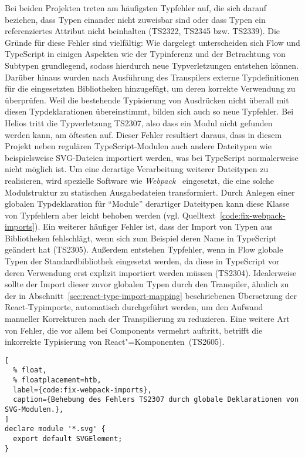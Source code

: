 Bei beiden Projekten treten am häufigsten Typfehler auf, die sich darauf beziehen, dass Typen einander nicht zuweisbar sind oder dass Typen ein referenziertes Attribut nicht beinhalten (TS2322, TS2345 bzw. TS2339). Die Gründe für diese Fehler sind vielfältig: Wie dargelegt unterscheiden sich Flow und TypeScript in einigen Aspekten wie der Typinferenz und der Betrachtung von Subtypen grundlegend, sodass hierdurch neue Typverletzungen entstehen können. Darüber hinaus wurden nach Ausführung des Transpilers externe Typdefinitionen für die eingesetzten Bibliotheken hinzugefügt, um deren korrekte Verwendung zu überprüfen. Weil die bestehende Typisierung von Ausdrücken nicht überall mit diesen Typdeklarationen übereinstimmt, bilden sich auch so neue Typfehler. Bei Helios tritt die Typverletzung TS2307, also dass ein Modul nicht gefunden werden kann, am öftesten auf. Dieser Fehler resultiert daraus, dass in diesem Projekt neben regulären TypeScript-Modulen auch andere Dateitypen wie beispielsweise SVG-Dateien importiert werden, was bei TypeScript normalerweise nicht möglich ist. Um eine derartige Verarbeitung weiterer Dateitypen zu realisieren, wird spezielle Software wie \textit{Webpack}~\autocite{WEBPACK} eingesetzt, die eine solche Modulstruktur zu statischen Ausgabedateien transformiert. Durch Anlegen einer globalen Typdeklaration für \enquote{Module} derartiger Dateitypen kann diese Klasse von Typfehlern aber leicht behoben werden (vgl. Quelltext~\ref{code:fix-webpack-imports}). Ein weiterer häufiger Fehler ist, dass der Import von Typen aus Bibliotheken fehlschlägt, wenn sich zum Beispiel deren Name in TypeScript geändert hat (TS2305). Außerdem entstehen Typfehler, wenn in Flow globale Typen der Standardbibliothek eingesetzt werden, da diese in TypeScript vor deren Verwendung erst explizit importiert werden müssen (TS2304). Idealerweise sollte der Import dieser zuvor globalen Typen durch den Transpiler, ähnlich zu der in Abschnitt~\ref{sec:react-type-import-mapping} beschriebenen Übersetzung der React-Typimporte, automatisch durchgeführt werden, um den Aufwand manueller Korrekturen nach der Transpilierung zu reduzieren. Eine weitere Art von Fehler, die vor allem bei Components vermehrt auftritt, betrifft die inkorrekte Typisierung von React"=Komponenten~(TS2605).

\begin{lstlisting}[
  % float,
  % floatplacement=htb,
  label={code:fix-webpack-imports},
  caption={Behebung des Fehlers TS2307 durch globale Deklarationen von SVG-Modulen.},
]
declare module '*.svg' {
  export default SVGElement;
}
\end{lstlisting}

